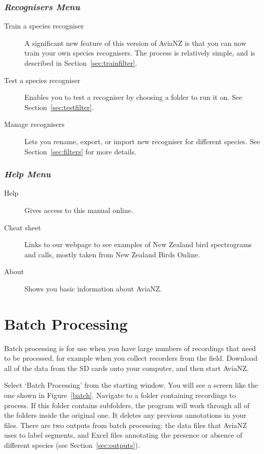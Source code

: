 \documentclass{article}
\begin{document}
\subsubsection{{\em Recognisers Menu}}

\begin{description}
\item [Train a species recogniser] A significant new feature of this version of AviaNZ is that you can now train your own species recognisers. The process is relatively simple, and is described in Section~\ref{sec:trainfilter}.
\item [Test a species recogniser] Enables you to test a recogniser by choosing a folder to run it on. See Section~\ref{sec:testfilter}.
\item[Manage recognisers] Lets you rename, export, or import new recogniser for different species. See Section~\ref{sec:filters} for more details.
\end{description}

\subsubsection{{\em Help Menu}}

\begin{description}
\item [Help] Gives access to this manual online.
\item [Cheat sheet] Links to our webpage to see examples of New Zealand bird spectrograms and calls, mostly taken from New Zealand Birds Online.
\item[About] Shows you basic information about AviaNZ.
\end{description}

\section{Batch Processing}
\label{sec:auto}

Batch processing is for use when you have large numbers of recordings that need to be processed, for example when you collect recorders from the field. Download all of the data from the SD cards onto your computer, and then start AviaNZ. 

Select `Batch Processing' from the starting window. You will see a screen like the one shown in Figure~\ref{batch}. Navigate to a folder containing recordings to process. If this folder contains subfolders, the program will work through all of the folders inside the original one. It deletes any previous annotations in your files. There are two outputs from batch processing: the data files that AviaNZ uses to label segments, and Excel files annotating the presence or absence of different species (see Section~\ref{sec:outputs}).
\end{document}
